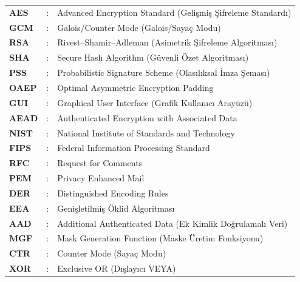\begin{tabular}{lrl}
	\bf{AES}    & : & Advanced Encryption Standard (Gelişmiş Şifreleme Standardı) \\
	\bf{GCM}    & : & Galois/Counter Mode (Galois/Sayaç Modu) \\
	\bf{RSA}    & : & Rivest–Shamir–Adleman (Asimetrik Şifreleme Algoritması) \\
	\bf{SHA}    & : & Secure Hash Algorithm (Güvenli Özet Algoritması) \\
	\bf{PSS}    & : & Probabilistic Signature Scheme (Olasılıksal İmza Şeması) \\
	\bf{OAEP}   & : & Optimal Asymmetric Encryption Padding \\
	\bf{GUI}    & : & Graphical User Interface (Grafik Kullanıcı Arayüzü) \\
	\bf{AEAD}   & : & Authenticated Encryption with Associated Data \\
	\bf{NIST}   & : & National Institute of Standards and Technology \\
	\bf{FIPS}   & : & Federal Information Processing Standard \\
	\bf{RFC}    & : & Request for Comments \\
	\bf{PEM}    & : & Privacy Enhanced Mail \\
	\bf{DER}    & : & Distinguished Encoding Rules \\
	\bf{EEA}    & : & Genişletilmiş Öklid Algoritması \\
	\bf{AAD}    & : & Additional Authenticated Data (Ek Kimlik Doğrulamalı Veri) \\
	\bf{MGF}    & : & Mask Generation Function (Maske Üretim Fonksiyonu) \\
	\bf{CTR}    & : & Counter Mode (Sayaç Modu) \\
	\bf{XOR}    & : & Exclusive OR (Dışlayıcı VEYA) \\
\end{tabular}